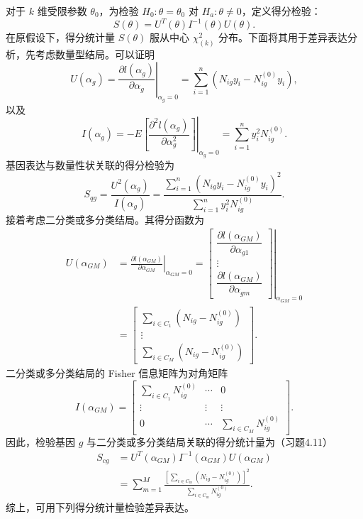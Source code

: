 对于 $k$ 维受限参数 $\theta_0$，为检验 $H_0:\theta=\theta_0$ 对 $H_a:\theta\ne0$，定义得分检验：
\begin{equation}
S(\theta)=U^T(\theta)I^{-1}(\theta)U(\theta).
\tag{4.84}
\end{equation}
在原假设下，得分统计量 $S(\theta)$ 服从中心 $\chi^2_{(k)}$ 分布。下面将其用于差异表达分析，先考虑数量型结局。可以证明
\begin{equation}
U(\alpha_g)=\left.\frac{\partial l(\alpha_g)}{\partial\alpha_g}\right|_{\alpha_g=0}
=\sum_{i=1}^{n}(N_{ig}y_i-N_{ig}^{(0)}y_i),
\tag{4.85}
\end{equation}
以及
\begin{equation}
I(\alpha_g)=\left.-E\left[\frac{\partial^2l(\alpha_g)}{\partial\alpha_g^2}\right]\right|_{\alpha_g=0}
=\sum_{i=1}^{n}y_i^2N_{ig}^{(0)}.
\tag{4.86}
\end{equation}
基因表达与数量性状关联的得分检验为
\begin{equation}
S_{qg}=\frac{U^2(\alpha_g)}{I(\alpha_g)}
=\frac{\sum_{i=1}^{n}(N_{ig}y_i-N_{ig}^{(0)}y_i)^2}{\sum_{i=1}^{n}y_i^2N_{ig}^{(0)}}.
\tag{4.87}
\end{equation}
接着考虑二分类或多分类结局。其得分函数为
\begin{equation}
\begin{aligned}
U(\alpha_{GM})
&=\left.\frac{\partial l(\alpha_{GM})}{\partial\alpha_{GM}}\right|_{\alpha_{GM}=0}
=\left.\begin{bmatrix}
\dfrac{\partial l(\alpha_{GM})}{\partial\alpha_{g1}}\\\vdots\\
\dfrac{\partial l(\alpha_{GM})}{\partial\alpha_{gm}}
\end{bmatrix}\right|_{\alpha_{GM}=0}\\
&=\begin{bmatrix}
\sum_{i\in C_1}(N_{ig}-N_{ig}^{(0)})\\\vdots\\
\sum_{i\in C_M}(N_{ig}-N_{ig}^{(0)})
\end{bmatrix}.
\end{aligned}
\tag{4.88}
\end{equation}
二分类或多分类结局的 Fisher 信息矩阵为对角矩阵
\begin{equation}
I(\alpha_{GM})=\begin{bmatrix}
\sum_{i\in C_1}N_{ig}^{(0)}&\cdots&0\\
\vdots&\vdots&\vdots\\
0&\cdots&\sum_{i\in C_M}N_{ig}^{(0)}
\end{bmatrix}.
\tag{4.89}
\end{equation}
因此，检验基因 $g$ 与二分类或多分类结局关联的得分统计量为（习题4.11）
\begin{equation}
\begin{aligned}
S_{cg}&=U^T(\alpha_{GM})I^{-1}(\alpha_{GM})U(\alpha_{GM})\\
&=\sum_{m=1}^{M}\frac{\left[\sum_{i\in C_m}(N_{ig}-N_{ig}^{(0)})\right]^2}{\sum_{i\in C_m}N_{ig}^{(0)}}.
\end{aligned}
\tag{4.90}
\end{equation}
综上，可用下列得分统计量检验差异表达。

